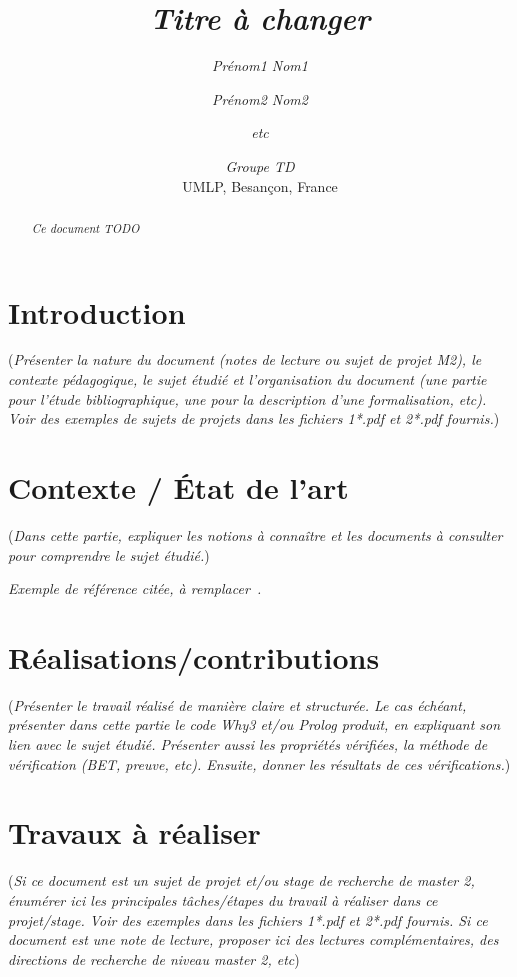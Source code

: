 \documentclass[a4paper]{article}
\title{\textit{Titre à changer}}
\author{\textit{Prénom1 Nom1} \and \textit{Prénom2 Nom2} \and \textit{etc}
}
\date{
\textit{Groupe TD}\\
\vspace{4mm}
UMLP, Besan\c{c}on, France
}
\begin{document}
\maketitle

\tableofcontents

\begin{abstract}
\textit{Ce document TODO}
\end{abstract}

\clearpage

\section{Introduction}

(\textit{Présenter la nature du document (notes de lecture ou sujet de projet M2), le contexte pédagogique, le sujet étudié et l'organisation du document (une partie pour l'étude bibliographique, une pour la description d'une formalisation, etc). Voir des exemples de sujets de projets dans les fichiers 1*.pdf et 2*.pdf fournis.})

\section{Contexte / État de l'art}

(\textit{Dans cette partie, expliquer les notions à connaître et les documents à consulter pour comprendre le sujet étudié.})

\textit{Exemple de référence citée, à remplacer~\cite{GS12}.}

\section{Réalisations/contributions}

(\textit{Présenter le travail réalisé de manière claire et structurée. Le cas échéant, présenter dans cette partie le code Why3 et/ou Prolog produit, en expliquant son lien avec le sujet étudié. Présenter aussi les propriétés vérifiées, la méthode de vérification (BET, preuve, etc). Ensuite, donner les résultats de ces vérifications.})

\section{Travaux à réaliser}

(\textit{Si ce document est un sujet de projet et/ou stage de recherche de master 2, énumérer ici les principales tâches/étapes du travail à réaliser dans ce projet/stage. Voir des exemples dans les fichiers 1*.pdf et 2*.pdf fournis. Si ce document est une note de lecture, proposer ici des lectures complémentaires, des directions de recherche de niveau master 2, etc})
\end{document}
